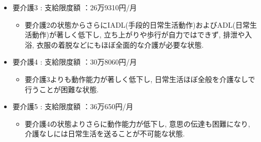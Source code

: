 \begin{itemize}
	\item 要介護3 : 支給限度額 ：26万9310円/月


	      \begin{itemize} \setlength{\itemsep}{-0.5mm} \setlength{\parskip}{-0.5mm}
		      \item 要介護2の状態からさらにIADL(手段的日常生活動作)およびADL(日常生活動作)が著しく低下し, 立ち上がりや歩行が自力ではできず, 排泄や入浴, 衣服の着脱などにもほぼ全面的な介護が必要な状態.

	      \end{itemize}

	\item 要介護4 : 支給限度額 ：30万8060円/月


	      \begin{itemize} \setlength{\itemsep}{-0.5mm} \setlength{\parskip}{-0.5mm}
		      \item 要介護3よりも動作能力が著しく低下し, 日常生活ほぼ全般を介護なしで行うことが困難な状態.

	      \end{itemize}

	\item 要介護5 : 支給限度額 ：36万650円/月


	      \begin{itemize} \setlength{\itemsep}{-0.5mm} \setlength{\parskip}{-0.5mm}
		      \item 要介護4の状態よりさらに動作能力が低下し, 意思の伝達も困難になり, 介護なしには日常生活を送ることが不可能な状態.

	      \end{itemize}


\end{itemize}













